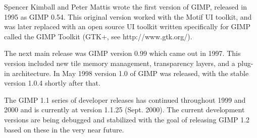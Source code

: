 Spencer Kimball and Peter Mattis wrote the first version of GIMP, released in
1995 as GIMP 0.54. This original version worked with the Motif UI toolkit, and
was later replaced with an open source UI toolkit written specifically for GIMP
called the GIMP Toolkit (GTK+, see http://www.gtk.org/).

The next main release was GIMP version 0.99 which came out in 1997. This
version included new tile memory management, transparency layers, and a plug-in
architecture. In May 1998 version 1.0 of GIMP was released, with the stable
version 1.0.4 shortly after that.

The GIMP 1.1 series of developer releases has continued throughout 1999 and
2000 and is currently at version 1.1.25 (Sept.  2000). The current development
versions are being debugged and stabilized with the goal of releasing GIMP 1.2
based on these in the very near future.
